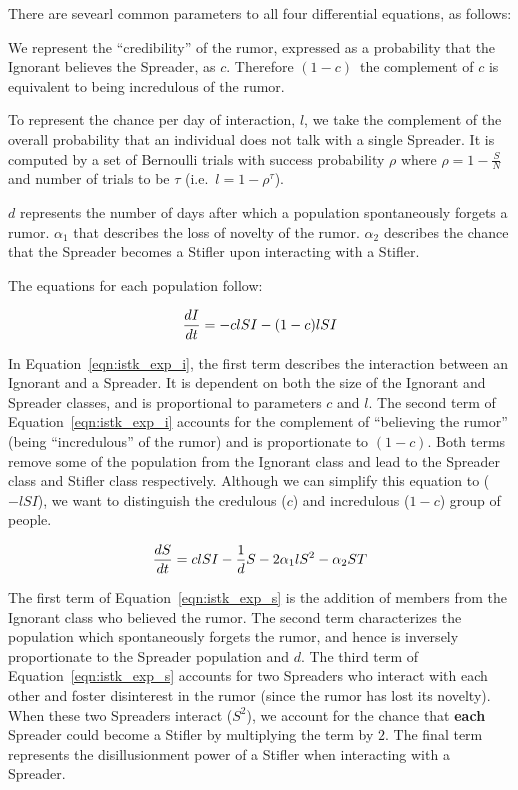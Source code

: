 There are sevearl common parameters to all four differential equations, as follows:

We represent the ``credibility'' of the rumor, expressed as a probability that the Ignorant believes the Spreader, as $ c $.
Therefore $ (1 - c) $\, the complement of $ c $ is equivalent to being incredulous of the rumor.

To represent the chance per day of interaction, $ l $, we take the complement of the overall probability that an individual does not talk with a single Spreader.
It is computed by a set of Bernoulli trials with success probability $ \rho $ where $ \rho = 1 - \frac{S}{N} $ and number of trials to be $ \tau $ (i.e.~$ l = 1 - \rho^\tau $).

$ d $ represents the number of days after which a population spontaneously forgets a rumor.
$\alpha_1$ that describes the loss of novelty of the rumor.
$ \alpha_2 $ describes the chance that the Spreader becomes a Stifler upon interacting with a Stifler.

The equations for each population follow:

\begin{equation}
\label{eqn:istk_exp_i}
\frac{dI}{dt}  = - clSI - (1-c)lSI \\
\end{equation}

In Equation~\ref{eqn:istk_exp_i}, the first term describes the interaction between an Ignorant and a Spreader.
It is dependent on both the size of the Ignorant and Spreader classes, and is proportional to parameters $ c $ and $ l $.
 The second term of Equation~\ref{eqn:istk_exp_i} accounts for the complement of ``believing the rumor'' (being ``incredulous'' of the rumor) and is proportionate to $ (1 - c) $.
Both terms remove some of the population from the Ignorant class and lead to the Spreader class and Stifler class respectively. Although we can simplify this equation to ($-lSI$), we want to distinguish the credulous ($ c $) and incredulous ($ 1 - c $) group of people.

\begin{equation}
\label{eqn:istk_exp_s} \frac{dS}{dt} = clSI - \frac{1}{d} S - 2 \alpha_1l S^2 - \alpha_2 ST \\
\end{equation}

The first term of Equation~\ref{eqn:istk_exp_s} is the addition of members from the Ignorant class who believed the rumor.
The second term characterizes the population which spontaneously forgets the rumor, and hence is inversely proportionate to the Spreader population and $ d $.
The third term of Equation~\ref{eqn:istk_exp_s} accounts for two Spreaders who interact with each other and foster disinterest in the rumor (since the rumor has lost its novelty).
When these two Spreaders interact ($S^2$), we account for the chance that \textbf{each} Spreader could become a Stifler by multiplying the term by $ 2 $.
The final term represents the disillusionment power of a Stifler when interacting with a Spreader.

